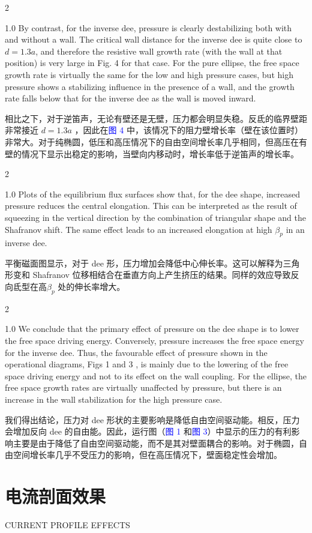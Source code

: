 \documentclass[utf8]{ctexart}
\newcommand\enzhbox[2]{
  	\quad\par \begin{paracol}{2} \colseprulecolor{black} 
  		\begin{spacing}{1.0}
  			\footnotesize  #1
  		\end{spacing}
  		\switchcolumn[1] 
  		#2
  	\end{paracol} \quad\par
  }
\begin{document}
\begin{sloppypar}
 
\enzhbox{  By contrast, for the inverse dee, pressure is clearly destabilizing both with and without a wall. The critical wall distance for the inverse dee is quite close to $d=1.3 a$, and therefore the resistive wall growth rate (with the wall at that position) is very large in Fig. 4 for that case. For the pure ellipse, the free space growth rate is virtually the same for the low and high pressure cases, but high pressure shows a stabilizing influence in the presence of a wall, and the growth rate falls below that for the inverse dee as the wall is moved inward.}{
相比之下，对于逆笛声，无论有壁还是无壁，压力都会明显失稳。反氐的临界壁距非常接近 $d=1.3 a$ ，因此在\textcolor{blue}{图 4} 中，该情况下的阻力壁增长率（壁在该位置时）非常大。对于纯椭圆，低压和高压情况下的自由空间增长率几乎相同，但高压在有壁的情况下显示出稳定的影响，当壁向内移动时，增长率低于逆笛声的增长率。}
  
 
\enzhbox{  Plots of the equilibrium flux surfaces show that, for the dee shape, increased pressure reduces the central elongation. This can be interpreted as the result of squeezing in the vertical direction by the combination of triangular shape and the Shafranov shift. The same effect leads to an increased elongation at high $\beta_{p}$ in an inverse dee.}{
平衡磁面图显示，对于 dee 形，压力增加会降低中心伸长率。这可以解释为三角形变和 Shafranov 位移相结合在垂直方向上产生挤压的结果。同样的效应导致反向氐型在高$\beta_{p}$ 处的伸长率增大。}
  
 
 
\enzhbox{  We conclude that the primary effect of pressure on the dee shape is to lower the free space driving energy. Conversely, pressure increases the free space energy for the inverse dee. Thus, the favourable effect of pressure shown in the operational diagrams, Figs 1 and 3 , is mainly due to the lowering of the free space driving energy and not to its effect on the wall coupling. For the ellipse, the free space growth rates are virtually unaffected by pressure, but there is an increase in the wall stabilization for the high pressure case.}{
我们得出结论，压力对 dee 形状的主要影响是降低自由空间驱动能。相反，压力会增加反向 dee 的自由能。因此，运行图（\textcolor{blue}{图 1} 和\textcolor{blue}{图 3}）中显示的压力的有利影响主要是由于降低了自由空间驱动能，而不是其对壁面耦合的影响。对于椭圆，自由空间增长率几乎不受压力的影响，但在高压情况下，壁面稳定性会增加。}
  
 \section{电流剖面效果}
 {  \small CURRENT PROFILE EFFECTS \par }
 

\end{sloppypar}
\end{document}
